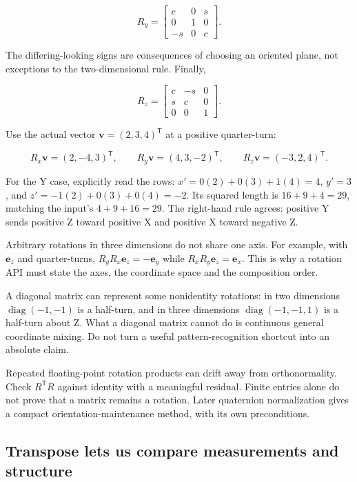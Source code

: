 \[
R_y=\begin{bmatrix}c&0&s\\0&1&0\\-s&0&c\end{bmatrix}.
\]

The differing-looking signs are consequences of choosing an oriented plane, not exceptions to the two-dimensional rule. Finally,

\[
R_z=\begin{bmatrix}c&-s&0\\s&c&0\\0&0&1\end{bmatrix}.
\]

Use the actual vector \(\mathbf v=(2,3,4)^{\mathsf T}\) at a positive quarter-turn:

\[
R_x\mathbf v=(2,-4,3)^{\mathsf T},\qquad
R_y\mathbf v=(4,3,-2)^{\mathsf T},\qquad
R_z\mathbf v=(-3,2,4)^{\mathsf T}.
\]

For the Y case, explicitly read the rows: \(x'=0(2)+0(3)+1(4)=4\), \(y'=3\), and \(z'=-1(2)+0(3)+0(4)=-2\). Its squared length is \(16+9+4=29\), matching the input's \(4+9+16=29\). The right-hand rule agrees: positive Y sends positive Z toward positive X and positive X toward negative Z.

Arbitrary rotations in three dimensions do not share one axis. For example, with \(\mathbf e_z\) and quarter-turns, \(R_yR_x\mathbf e_z=-\mathbf e_y\) while \(R_xR_y\mathbf e_z=\mathbf e_x\). This is why a rotation API must state the axes, the coordinate space and the composition order.

A diagonal matrix can represent some nonidentity rotations: in two dimensions \(\operatorname{diag}(-1,-1)\) is a half-turn, and in three dimensions \(\operatorname{diag}(-1,-1,1)\) is a half-turn about Z. What a diagonal matrix cannot do is continuous general coordinate mixing. Do not turn a useful pattern-recognition shortcut into an absolute claim.

Repeated floating-point rotation products can drift away from orthonormality. Check \(R^{\mathsf T}R\) against identity with a meaningful residual. Finite entries alone do not prove that a matrix remains a rotation. Later quaternion normalization gives a compact orientation-maintenance method, with its own preconditions.

\subsection{Transpose lets us compare measurements and structure}\label{01-foundations-i-ch018-transpose-lets-us-compare-measurements-and-structure}

